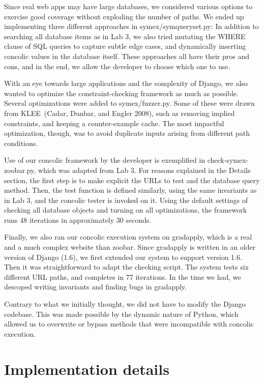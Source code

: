 \documentclass{scrartcl}
\begin{document}
Since real web apps may have large databases, we considered various
options to exercise good coverage without exploding the number of
paths. We ended up implementing three different approaches in
symex/symqueryset.py: In addition to searching all database items as
in Lab 3, we also tried mutating the WHERE clause of SQL queries to
capture subtle edge cases, and dynamically inserting concolic values
in the database itself. These approaches all have their pros and cons,
and in the end, we allow the developer to choose which one to use.

With an eye towards large applications and the complexity of Django,
we also wanted to optimize the constraint-checking framework as much
as possible. Several optimizations were added to symex/fuzzer.py. Some
of these were drawn from KLEE~(Cadar, Dunbar, and Engler 2008), such
as removing implied constraints, and keeping a counter-example cache.
The most impactful optimization, though, was to avoid duplicate inputs
arising from different path conditions.

Use of our concolic framework by the developer is exemplified in
check-symex-zoobar.py, which was adapted from Lab 3. For reasons
explained in the Details section, the first step is to make explicit
the URLs to test and the database query method. Then, the test
function is defined similarly, using the same invariants as in Lab 3,
and the concolic tester is invoked on it. Using the default settings
of checking all database objects and turning on all optimizations, the
framework runs 48 iterations in approximately 30 seconds.

Finally, we also ran our concolic execution system on gradapply, which
is a real and a much complex website than zoobar. Since gradapply is
written in an older version of Django (1.6), we first extended our
system to support version 1.6. Then it was straightforward to adapt
the checking script. The system tests six different URL paths, and
completes in 77 iterations. In the time we had, we descoped writing
invariants and finding bugs in gradapply.

Contrary to what we initially thought, we did not have to modify the
Django codebase. This was made possible by the dynamic nature of
Python, which allowed us to overwrite or bypass methods that were
incompatible with concolic execution.


\section{Implementation details}
\end{document}
